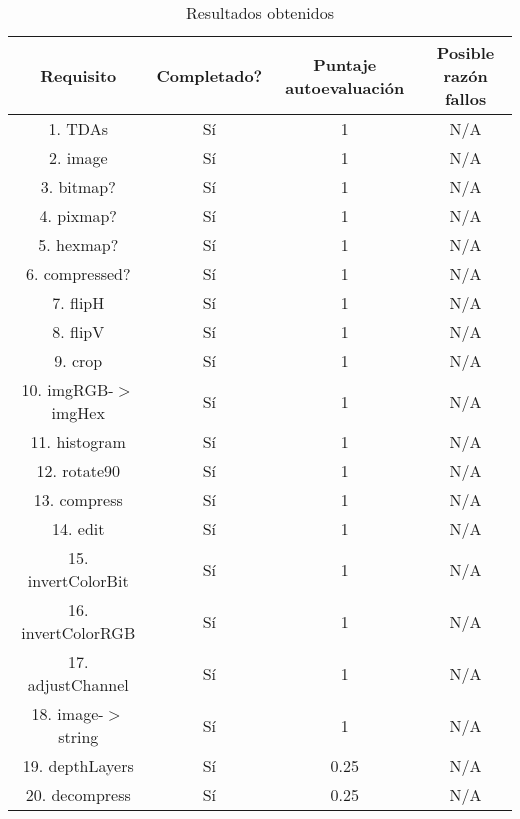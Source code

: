 \begin{table}[H]
    \begin{center}
    \begin{tabular}{| c | c | c | c |}
    \hline
    Requisito & Completado? & Puntaje autoevaluación & Posible razón fallos \\ \hline \hline
    1. TDAs & Sí & 1 & N/A \\ \hline
    2. image & Sí & 1 & N/A \\ \hline
    3. bitmap? & Sí & 1 & N/A \\ \hline
    4. pixmap? & Sí & 1 & N/A \\ \hline
    5. hexmap? & Sí & 1 & N/A \\ \hline
    6. compressed? & Sí & 1 & N/A \\ \hline
    7. flipH & Sí & 1 & N/A \\ \hline
    8. flipV & Sí & 1 & N/A \\ \hline
    9. crop & Sí & 1 & N/A \\ \hline
    10. imgRGB-$>$imgHex & Sí & 1 & N/A \\ \hline
    11. histogram & Sí & 1 & N/A \\ \hline
    12. rotate90 & Sí & 1 & N/A \\ \hline
    13. compress & Sí & 1 & N/A \\ \hline
    14. edit & Sí & 1 & N/A \\ \hline
    15. invertColorBit & Sí & 1 & N/A \\ \hline
    16. invertColorRGB & Sí & 1 & N/A \\ \hline
    17. adjustChannel & Sí & 1 & N/A \\ \hline
    18. image-$>$string & Sí & 1 & N/A \\ \hline
    19. depthLayers & Sí & 0.25 & N/A \\  \hline
    20. decompress & Sí & 0.25 & N/A \\ \hline
    \end{tabular}
    \caption{Resultados obtenidos}
    \label{tab:Resultados}
    \end{center}
\end{table}